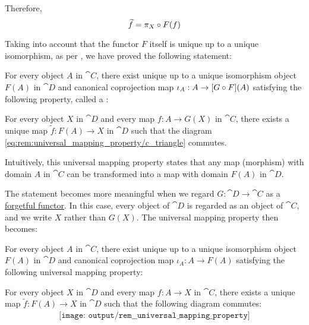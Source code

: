 \begin{remark}
  Therefore,
  \begin{equation*}
    \widetilde{f} = \pi_X \bincirc F(f)
  \end{equation*}

  Taking into account that the functor \( F \) itself is unique up to a unique isomorphism, as per , we have proved the following statement:
  \begin{displayquote}
    For every object \( A \) in \( \cat{C} \), there exist unique up to a unique isomorphism object \( F(A) \) in \( \cat{D} \) and canonical coprojection map \( \iota_A: A \to [G \bincirc F](A) \) satisfying the following property, called a :
    \begin{displayquote}
      For every object \( X \) in \( \cat{D} \) and every map \( f: A \to G(X) \) in \( \cat{C} \), there exists a unique map \( \widetilde{f}: F(A) \to X \) in \( \cat{D} \) such that the diagram \eqref{eq:rem:universal_mapping_property/c_triangle} commutes.
    \end{displayquote}
  \end{displayquote}

  Intuitively, this universal mapping property states that any map (morphism) with domain \( A \) in \( \cat{C} \) can be transformed into a map with domain \( F(A) \) in \( \cat{D} \).

  The statement becomes more meaningful when we regard \( G: \cat{D} \to \cat{C} \) as a \hyperref[def:concrete_category]{forgetful functor}. In this case, every object of \( \cat{D} \) is regarded as an object of \( \cat{C} \), and we write \( X \) rather than \( G(X) \). The universal mapping property then becomes:
  \begin{displayquote}
    For every object \( A \) in \( \cat{C} \), there exist unique up to a unique isomorphism object \( F(A) \) in \( \cat{D} \) and canonical coprojection map \( \iota_A: A \to F(A) \) satisfying the following universal mapping property:
    \begin{displayquote}
      For every object \( X \) in \( \cat{D} \) and every map \( f: A \to X \) in \( \cat{C} \), there exists a unique map \( \widetilde{f}: F(A) \to X \) in \( \cat{D} \) such that the following diagram commutes:
      \begin{equation}\label{eq:rem:universal_mapping_property/c_triangle_forgetful}
        \begin{aligned}
          \texttt{[image: output/rem\_\_universal\_mapping\_property]}
        \end{aligned}
      \end{equation}
    \end{displayquote}
  \end{displayquote}


\end{remark}
